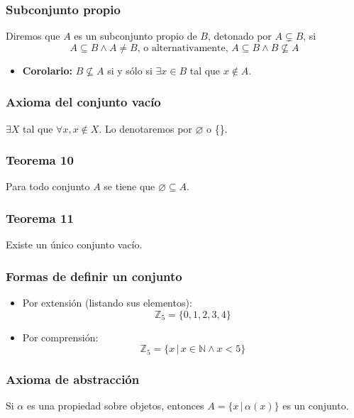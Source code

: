 \begin{multicols}{2}
    \subsubsection*{Subconjunto propio}
    Diremos que $A$ es un subconjunto propio de $B$, detonado por $A \subsetneq B$, si
    $$
    A \subseteq B \wedge A \neq B \text{, o alternativamente, } A \subseteq B \wedge B \nsubseteq A
    $$
    
    \begin{itemize}
        \item \textbf{Corolario:} $B \nsubseteq A$ si y sólo si $\exists x \in B$ tal que $x \notin A$.
    \end{itemize}
    
    \subsubsection*{Axioma del conjunto vacío}
    $\exists X$ tal que $\forall x, x \notin X$. Lo denotaremos por $\varnothing$ o \{\}.
    
    \subsubsection*{Teorema 10}
    Para todo conjunto $A$ se tiene que $\varnothing \subseteq A$.
    
    \subsubsection*{Teorema 11}
    Existe un único conjunto vacío.
    
    \subsubsection*{Formas de definir un conjunto}
    \begin{itemize}
        \item Por extensión (listando sus elementos): 
        $$\mathbb{Z}_5 = \{0,1,2,3,4\}$$
        \item Por comprensión: 
        $$\mathbb{Z}_5 = \{x \,|\, x \in \mathbb{N} \wedge x < 5\}$$
    \end{itemize}
    
    \subsubsection*{Axioma de abstracción}
    Si $\alpha$ es una propiedad sobre objetos, entonces $A = \{x \,|\, \alpha(x)\}$ es un conjunto.
    

\end{multicols}
